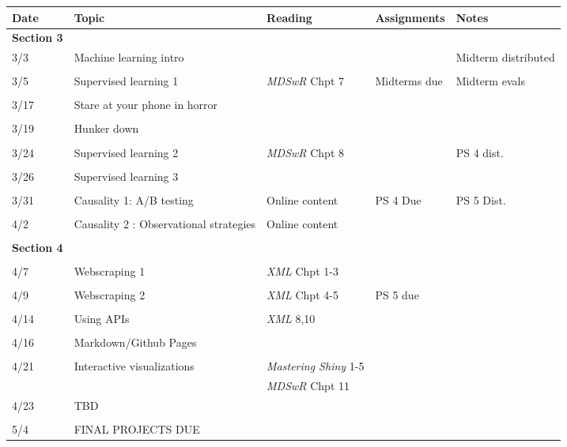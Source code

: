 \documentclass[11pt]{article}
\begin{document}
\begin{small}
\begin{center}
\begin{tabular}{p{1.5cm} p{4cm} p{3.5cm} p{3cm} p{4cm}}
  \toprule
  Date & Topic & Reading & Assignments & Notes  \\
  \midrule
\textbf{Section 3} \\
3/3 & Machine learning intro  & & & Midterm distributed\\
\\
3/5 & Supervised learning 1& \textit{MDSwR} Chpt 7 &  Midterms due& Midterm evals\\
\\
3/17 & Stare at your phone in horror\\
\\
3/19 & Hunker down \\
\\
3/24 & Supervised learning 2& \textit{MDSwR} Chpt 8   & & PS 4 dist.\\
\\
3/26  &  Supervised learning 3 & \\
\\
3/31  & Causality 1: A/B testing & Online content & PS 4 Due & PS 5 Dist. \\
\\
4/2 & Causality 2 : Observational strategies &  Online content \\
\\
\textbf{Section 4} \\
\\
4/7 & Webscraping 1 & \textit{XML} Chpt 1-3\\
\\
4/9 & Webscraping 2 & \textit{XML} Chpt 4-5 & PS 5 due \\
\\
4/14 & Using APIs & \textit{XML} 8,10 \\
\\
4/16 & Markdown/Github Pages & \\
\\
4/21 &  Interactive visualizations & \textit{Mastering Shiny} 1-5 \\
& & \textit{MDSwR} Chpt 11 \\
4/23 & TBD & & & \\
\\
5/4 & FINAL PROJECTS DUE
\end{tabular}
\end{center}
\end{small}
\end{document}
